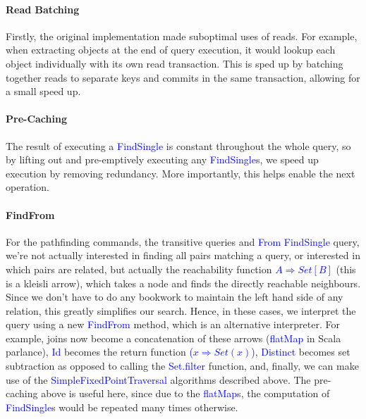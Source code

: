 \documentclass[12pt,a4paper,twoside,openright]{report}
\newcommand\codeName[1]{\textcolor{blue}{#1}}
\begin{document}
		\paragraph{Read Batching}
		Firstly, the original implementation made suboptimal uses of reads. For example, when extracting objects at the end of query execution, it would lookup each object individually with its own read transaction. This is sped up by batching together reads to separate keys and commits in the same transaction, allowing for a small speed up.
		
		\paragraph{Pre-Caching}
		The result of executing a \codeName{FindSingle} is constant throughout the whole query, so by lifting out and pre-emptively executing any \codeName{FindSingle}s, we speed up execution by removing redundancy. More importantly, this helps enable the next operation.
		
		\paragraph{FindFrom}
		For the pathfinding commands, the transitive queries and \codeName{From} \codeName{FindSingle} query, we’re not actually interested in finding all pairs matching a query, or interested in which pairs are related, but actually the reachability function \codeName{$A \Rightarrow Set[B]$} (this is a kleisli arrow), which takes a node and finds the directly reachable neighbours. Since we don’t have to do any bookwork to maintain the left hand side of any relation, this greatly simplifies our search. Hence, in these cases, we interpret the query using a new \codeName{FindFrom} method, which is an alternative interpreter. For example, joins now become a concatenation of these arrows (\codeName{flatMap}  in Scala parlance), \codeName{Id} becomes the return function \codeName{($x \Rightarrow Set(x)$)}, \codeName{Distinct} becomes set subtraction as opposed to calling the \codeName{Set.filter} function, and, finally, we can make use of the \codeName{SimpleFixedPointTraversal} algorithms described above. The pre-caching above is useful here, since due to the \codeName{flatMap}s, the computation of \codeName{FindSingle}s would be repeated many times otherwise.
\end{document}
